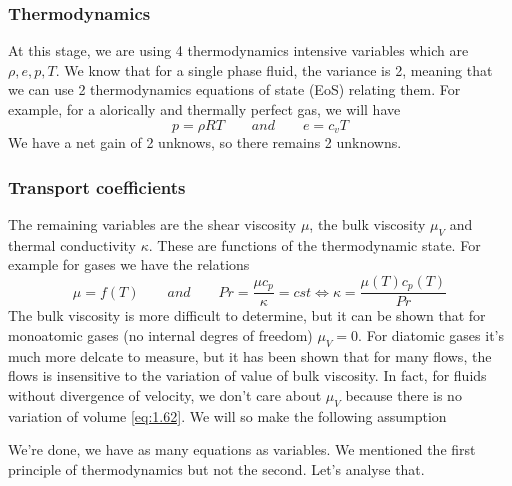 	\subsubsection{Thermodynamics}
		At this stage, we are using 4 thermodynamics intensive variables which are $\rho, e, p, T$. We know that for a single phase fluid, the variance is 2, meaning that we can use 2 thermodynamics equations of state (EoS) relating them. For example, for a alorically and thermally perfect gas, we will have 
		\begin{equation}
			p = \rho R T \qquad and \qquad e = c_v T
		\end{equation}		 
		We have a net gain of 2 unknows, so there remains 2 unknowns.  
		
	\subsubsection{Transport coefficients}
		The remaining variables are the shear viscosity $\mu$, the bulk viscosity $\mu _V$ and thermal conductivity $\kappa$. These are functions of the thermodynamic state. For example for gases we have the relations 
		\begin{equation}
			\mu = f(T) \qquad and \qquad Pr = \frac{\mu c_p}{\kappa} = cst \Leftrightarrow \kappa = \frac{\mu (T) c_p (T)}{Pr}
		\end{equation}
		The bulk viscosity is more difficult to determine, but it can be shown that for monoatomic gases (no internal degres of freedom) $\mu _V=0$. For diatomic gases it's much more delcate to measure, but it has been shown that for many flows, the flows is insensitive to the variation of value of bulk viscosity. In fact, for fluids without divergence of velocity, we don't care about $\mu _V$ because there is no variation of volume  \eqref{eq:1.62}. We will so make the following assumption
		\begin{center}
		\end{center}
		 We're done, we have as many equations as variables. We mentioned the first principle of thermodynamics but not the second. Let's analyse that. 
		 
